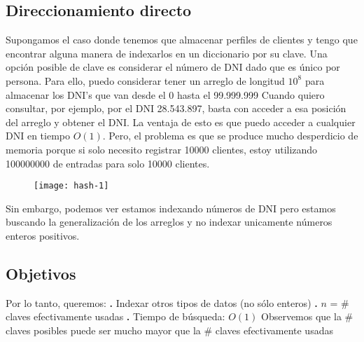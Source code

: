 \documentclass[10pt,a4paper]{article}
\begin{document}
\subsection{Direccionamiento directo}

Supongamos el caso donde tenemos que almacenar perfiles de clientes y tengo que encontrar alguna manera de indexarlos en un diccionario por su clave. 
\newline
\newline
Una opción posible de clave es considerar el número de DNI dado que es único por persona. Para ello, puedo considerar tener un arreglo de longitud $10^{8}$ para almacenar los DNI's que van desde el 0 hasta el 99.999.999 
\newline
\newline
Cuando quiero consultar, por ejemplo, por el DNI 28.543.897, basta con acceder a esa posición del arreglo y obtener el DNI.
\newline
\newline
La ventaja de esto es que puedo acceder a cualquier DNI en tiempo $O(1)$. Pero, el problema es que se produce mucho desperdicio de memoria porque si solo necesito registrar 10000 clientes, estoy utilizando 100000000 de entradas para solo 10000 clientes. 

\begin{figure}[h]
	\centering
\texttt{[image: hash-1]}
	\label{drivers1}
\end{figure}

Sin embargo, podemos ver estamos indexando números de DNI pero estamos buscando la generalización de los arreglos y no indexar unicamente números enteros positivos.
\newpage

\subsection{Objetivos}

Por lo tanto, queremos:
\newline
\newline
\textbf{.} Indexar otros tipos de datos (no sólo enteros)
\newline
\newline
\textbf{.} $n$ = \# claves efectivamente usadas 
\newline
\newline
\textbf{.} Tiempo de búsqueda: $O(1)$
\newline
\newline
Observemos que la \# claves posibles puede ser mucho mayor que la \# claves efectivamente usadas
\end{document}

